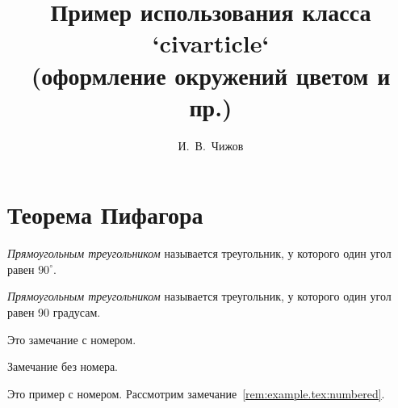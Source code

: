 \documentclass[colorthm]{../civarticle}
\title{
    Пример использования класса `civarticle`\\
    \medskip\Large{(оформление окружений цветом и пр.)}
}
\author{И.~В.~Чижов}
\begin{document}
\blindmathtrue

\maketitle

\begin{abstract}
  \Blindtext[2]
\end{abstract}

\keywords{%
  \Blindtext[1]
}

\tableofcontents
\par
\vspace{3\bigskipamount}
\par

\Blindtext[1]
\section{Теорема Пифагора}
\label{sec:thm-pif}

\begin{definition}\label{def:example.tex:triange}
  \emph{Прямоугольным треугольником} называется треугольник, у
  которого один угол равен \(90^{\circ}\).
\end{definition}

\Blindtext[2]

\begin{definition*}
  \emph{Прямоугольным треугольником} называется треугольник, у
  которого один угол равен 90 градусам.
\end{definition*}

\blindmathtrue\blindmathpaper

\begin{remark} \label{rem:example.tex:numbered}
  Это замечание с номером.
  \blindtext%
\end{remark}

\Blindtext[2]

\begin{remark*}
  Замечание без номера.

  \Blindtext[2]
\end{remark*}

\Blindtext[2]

\begin{example}\label{ex:example:myexample}
  Это пример с номером.
  Рассмотрим замечание~\ref{rem:example.tex:numbered}.
  \Blindtext[2]
\end{example}

\Blindtext[2]
\end{document}
